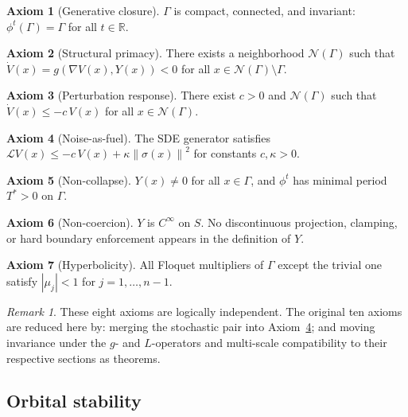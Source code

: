 \documentclass[12pt, oneside]{book}
\theoremstyle{plain}
\theoremstyle{definition}
\newtheorem{axiom}{Axiom}
\theoremstyle{remark}
\newtheorem{remark}{Remark}[section]
\newcommand{\R}{\mathbb{R}}
\newcommand{\Orb}{\Gamma}
\newcommand{\cN}{\mathcal{N}}
\newcommand{\cL}{\mathcal{L}}
\newcommand{\norm}[1]{\left\|#1\right\|}
\newcommand{\abs}[1]{\left|#1\right|}
\begin{document}
\begin{axiom}[Generative closure]\label{ax:closure}
$\Orb$ is compact, connected, and invariant:
$\phi^t(\Orb)=\Orb$ for all $t\in\R$.
\end{axiom}

\begin{axiom}[Structural primacy]\label{ax:primacy}
There exists a neighborhood $\cN(\Orb)$ such that
$\dot V(x)=g(\nabla V(x),Y(x))<0$ for all $x\in\cN(\Orb)\setminus\Orb$.
\end{axiom}

\begin{axiom}[Perturbation response]\label{ax:response}
There exist $c>0$ and $\cN(\Orb)$ such that
$\dot V(x)\le -c\,V(x)$ for all $x\in\cN(\Orb)$.
\end{axiom}

\begin{axiom}[Noise-as-fuel]\label{ax:noise}
The SDE generator satisfies
$\cL V(x)\le -c\,V(x)+\kappa\norm{\sigma(x)}^2$
for constants $c,\kappa>0$.
\end{axiom}

\begin{axiom}[Non-collapse]\label{ax:noncollapse}
$Y(x)\ne 0$ for all $x\in\Orb$, and $\phi^t$ has minimal period
$T^*>0$ on $\Orb$.
\end{axiom}

\begin{axiom}[Non-coercion]\label{ax:smooth}
$Y$ is $C^\infty$ on $S$. No discontinuous projection, clamping,
or hard boundary enforcement appears in the definition of $Y$.
\end{axiom}

\begin{axiom}[Hyperbolicity]\label{ax:hyperbolic}
All Floquet multipliers of $\Orb$ except the trivial one satisfy
$\abs{\mu_j}<1$ for $j=1,\ldots,n-1$.
\end{axiom}

\begin{remark}
These eight axioms are logically independent. The original ten axioms
are reduced here by: merging the stochastic pair into
Axiom~\ref{ax:noise}; and moving invariance under the $g$- and
$L$-operators and multi-scale compatibility to their respective
sections as theorems.
\end{remark}

\subsection{Orbital stability}
\end{document}
